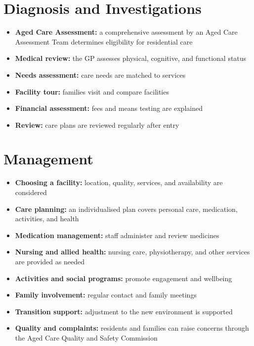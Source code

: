 \section*{Diagnosis and Investigations}
\begin{itemize}
    \item \textbf{Aged Care Assessment:} a comprehensive assessment by an Aged Care Assessment Team determines eligibility for residential care
    \item \textbf{Medical review:} the GP assesses physical, cognitive, and functional status
    \item \textbf{Needs assessment:} care needs are matched to services
    \item \textbf{Facility tour:} families visit and compare facilities
    \item \textbf{Financial assessment:} fees and means testing are explained
    \item \textbf{Review:} care plans are reviewed regularly after entry
\end{itemize}

\section*{Management}
\begin{itemize}
    \item \textbf{Choosing a facility:} location, quality, services, and availability are considered
    \item \textbf{Care planning:} an individualised plan covers personal care, medication, activities, and health
    \item \textbf{Medication management:} staff administer and review medicines
    \item \textbf{Nursing and allied health:} nursing care, physiotherapy, and other services are provided as needed
    \item \textbf{Activities and social programs:} promote engagement and wellbeing
    \item \textbf{Family involvement:} regular contact and family meetings
    \item \textbf{Transition support:} adjustment to the new environment is supported
    \item \textbf{Quality and complaints:} residents and families can raise concerns through the Aged Care Quality and Safety Commission
\end{itemize}

